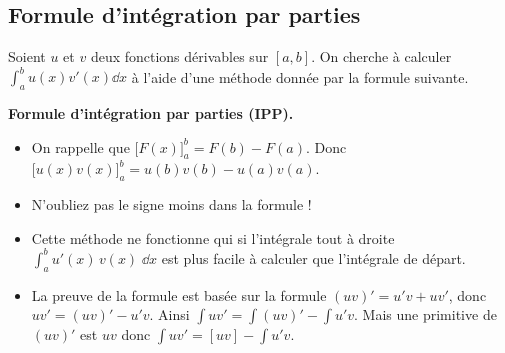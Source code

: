 \documentclass[11pt,class=report,crop=false]{standalone}
\begin{document}






\bigskip

\subsection*{Formule d'intégration par parties}


Soient $u$ et $v$ deux fonctions dérivables sur $[a,b]$. On cherche à calculer $\int_{a}^{b}u(x)v'(x)\dd x$ à l'aide d'une méthode donnée par la formule suivante.

\textbf{Formule d'intégration par parties (IPP).}

\begin{itemize}

  \item On rappelle que $\big[F(x)\big]^b_a = F(b)-F(a)$. Donc
 $\big[u(x)v(x)\big]_a^b = u(b)v(b) - u(a)v(a)$.

  \item N'oubliez pas le signe \og{}moins\fg{} dans la formule !

  \item Cette méthode ne fonctionne qui si l'intégrale tout à droite $\int_a^b u'(x) \, v(x)\;\dd x$
est plus facile à calculer que l'intégrale de départ.

  \item La preuve de la formule est basée sur la formule $(uv)'=u'v+uv'$, donc $uv' = (uv)' - u'v$.
  Ainsi $\int uv' = \int(uv)' - \int u'v$. Mais une primitive de $(uv)'$ est $uv$ donc  $\int uv' = [uv] - \int u'v$.
\end{itemize}
\end{document}
